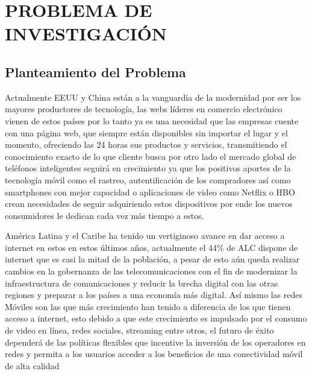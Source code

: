 \newpage

\section{PROBLEMA DE INVESTIGACIÓN}
\subsection{Planteamiento del Problema}



\large 
\doublespacing

Actualmente EEUU y China están a la vanguardia de la modernidad por ser los mayores productores de tecnología, las webs líderes en comercio electrónico vienen de estos países por lo tanto ya es una necesidad que las empresas cuente con una página web, que siempre están disponibles sin importar el lugar y el momento, ofreciendo las 24 horas sus productos y servicios, transmitiendo el conocimiento exacto de lo que cliente busca por otro lado el mercado global de teléfonos inteligentes seguirá en crecimiento ya que los positivos aportes de la tecnología móvil como el rastreo, autentificación de los compradores así como smartphones con mejor capacidad o aplicaciones de video como Netflix o HBO crean necesidades de seguir adquiriendo estos dispositivos por ende los nuevos consumidores le dedican cada vez más tiempo a estos.

América Latina y el Caribe ha tenido un vertiginoso avance en dar acceso a internet en estos en estos últimos años, actualmente el 44\% de ALC dispone de internet que es casi la mitad de la población, a pesar de esto aún queda realizar cambios en la gobernanza de las telecomunicaciones con el fin de modernizar la infraestructura de comunicaciones y reducir la brecha digital con las otras regiones y preparar a los países a una economía más digital. Así mismo las redes Móviles son las que más crecimiento han tenido a diferencia de los que tienen acceso a internet, esto debido a que este crecimiento es impulsado por el consumo de video en línea, redes sociales, streaming entre otros, el futuro de éxito dependerá de las políticas flexibles que incentive la inversión de los operadores en redes y permita a los usuarios acceder a los beneficios de una conectividad móvil de alta calidad

